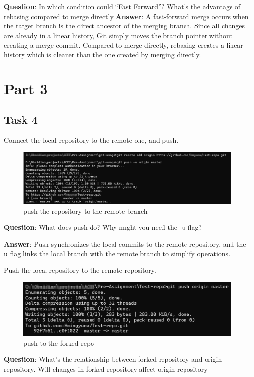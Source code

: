 \documentclass{article}
\begin{document}
\textbf{Question}:  In which condition could ``Fast Forward''? What's the advantage of rebasing compared to merge directly
\textbf{Answer}: A fast-forward merge occurs when the target branch is the direct ancestor of the merging branch.
Since all changes are already in a linear history, Git simply moves the branch pointer without creating a merge commit.
Compared to merge directly, rebasing creates a linear history which is cleaner than the one created by merging directly.

\section{Part 3}
\subsection{Task 4}
Connect the local repository to the remote one, and push.
\begin{figure}[H]
\centering
\includegraphics[width = \textwidth]{../figures/remote.png}
\caption{push the repository to the remote branch}
\end{figure}
\textbf{Question}: What does push do? Why might you need the -u flag?

\textbf{Answer}: Push synchronizes the local commits to the remote repository, and the -u flag links the local branch with the remote branch to simplify operations.

Push the local repository to the remote repository.
\begin{figure}[H]
\centering
\includegraphics[width = \textwidth]{../figures/push.png}
\caption{push to the forked repo}
\end{figure}
\textbf{Question}: What's the relationship between forked repository and origin repository. Will changes in forked repository affect origin repository
\end{document}
